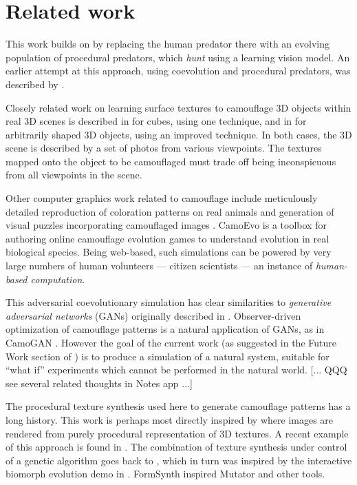 \documentclass[acmtog]{acmart}
\newcommand{\jargon}[1]{\textit{#1}}
\begin{document}
\section{Related work}
This work builds on \citet{reynolds_iec_2011} by replacing the human predator there with an evolving population of procedural predators, which \jargon{hunt} using a learning vision model. An earlier attempt at this approach, using coevolution and procedural predators, was described by \citet{harrington_coevolution_2014}.
\par
Closely related work on learning surface textures to camouflage 3D objects within real 3D scenes is described in \citet{owens_camouflaging_2014} for cubes, using one technique, and in \citet{guo_ganmouflage_2022} for arbitrarily shaped 3D objects, using an improved technique. In both cases, the 3D scene is described by a set of photos from various viewpoints. The textures mapped onto the object to be camouflaged must trade off being inconspicuous from all viewpoints in the scene.
\par
Other computer graphics work related to camouflage include meticulously detailed reproduction of coloration patterns on real animals \cite{de_gomensoro_malheiros_leopard_2020} and generation of visual puzzles incorporating camouflaged images \cite{chu_camo_image_2010} \cite{Zhang_Yin_Nie_Zheng_2020}. CamoEvo \cite{hancock_camoevo_2022} is a toolbox for authoring online camouflage evolution games to understand evolution in real biological species. Being web-based, such simulations can be powered by very large numbers of human volunteers — citizen scientists — an instance of \jargon{human-based computation}.
\par
This adversarial coevolutionary simulation has clear similarities to \jargon{generative adversarial networks} (GANs) originally described in \citet{goodfellow_gan_2014}. Observer-driven optimization of camouflage patterns is a natural application of GANs, as in CamoGAN \cite{talas_camogan_2020}. However the goal of the current work (as suggested in the Future Work section of \citet{reynolds_iec_2011}) is to produce a simulation of a natural system, suitable for “what if” experiments which cannot be performed in the natural world. [... QQQ see several related thoughts in Notes app ...]
\par
The procedural texture synthesis used here to generate camouflage patterns has a long history. This work is perhaps most directly inspired by \citet{perlin_image_1985} where images are rendered from purely procedural representation of 3D textures. A recent example of this approach is found in \citet{Guerrero_MatFormer_2022}. The combination of texture synthesis under control of a genetic algorithm goes back to \citet{sims_artificial_1991}, which in turn was inspired by the interactive biomorph evolution demo in \citet{dawkins_blind_1986}. FormSynth \cite{latham_form_1989} inspired Mutator \cite{todd_evolutionary_1994} and other tools.
\end{document}
